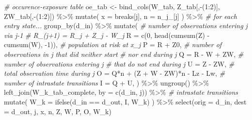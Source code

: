 \documentclass[10pt, twoside]{article}
\newenvironment{Shaded}{}{}
\newcommand{\AttributeTok}[1]{#1}
\newcommand{\CommentTok}[1]{\textit{#1}}
\newcommand{\DecValTok}[1]{#1}
\newcommand{\FunctionTok}[1]{#1}
\newcommand{\NormalTok}[1]{#1}
\newcommand{\OtherTok}[1]{#1}
\newcommand{\SpecialCharTok}[1]{#1}
\newcommand{\StringTok}[1]{#1}
\begin{document}
\begin{Shaded}
\begin{Highlighting}[]
  \CommentTok{\# occurence{-}exposure table}
\NormalTok{  oe\_tab }\OtherTok{\textless{}{-}}
    \FunctionTok{bind\_cols}\NormalTok{(W\_tab, Z\_tab[,}\SpecialCharTok{{-}}\NormalTok{(}\DecValTok{1}\SpecialCharTok{:}\DecValTok{2}\NormalTok{)], ZW\_tab[,}\SpecialCharTok{{-}}\NormalTok{(}\DecValTok{1}\SpecialCharTok{:}\DecValTok{2}\NormalTok{)]) }\SpecialCharTok{\%\textgreater{}\%}
    \FunctionTok{mutate}\NormalTok{(}
      \AttributeTok{x =}\NormalTok{ breaks[j],}
      \AttributeTok{n =}\NormalTok{ n\_j\_[j]}
\NormalTok{    ) }\SpecialCharTok{\%\textgreater{}\%}
    \CommentTok{\# for each entry state...}
    \FunctionTok{group\_by}\NormalTok{(d\_in) }\SpecialCharTok{\%\textgreater{}\%}
    \FunctionTok{mutate}\NormalTok{(}
      \CommentTok{\# number of observations entering j via j{-}1}
      \CommentTok{\# R\_(j+1) = R\_j + Z\_j {-} W\_j}
      \AttributeTok{R =} \FunctionTok{c}\NormalTok{(}\DecValTok{0}\NormalTok{, }\FunctionTok{head}\NormalTok{(}\FunctionTok{cumsum}\NormalTok{(Z) }\SpecialCharTok{{-}} \FunctionTok{cumsum}\NormalTok{(W), }\SpecialCharTok{{-}}\DecValTok{1}\NormalTok{)),}
      \CommentTok{\# population at risk at x\_j}
      \AttributeTok{P =}\NormalTok{ R }\SpecialCharTok{+}\NormalTok{ Z0,}
      \CommentTok{\# number of observations in j that did neither start}
      \CommentTok{\# nor end during j}
      \AttributeTok{Q =}\NormalTok{ R }\SpecialCharTok{{-}}\NormalTok{ W }\SpecialCharTok{+}\NormalTok{ ZW,}
      \CommentTok{\# number of observations entering j}
      \CommentTok{\# that do not end during j}
      \AttributeTok{U =}\NormalTok{ Z }\SpecialCharTok{{-}}\NormalTok{ ZW,}
      \CommentTok{\# total observation time during j}
      \AttributeTok{O =}\NormalTok{ Q}\SpecialCharTok{*}\NormalTok{n }\SpecialCharTok{+}\NormalTok{ (Z }\SpecialCharTok{+}\NormalTok{ W }\SpecialCharTok{{-}}\NormalTok{ ZW)}\SpecialCharTok{*}\NormalTok{n }\SpecialCharTok{{-}}\NormalTok{ Lz }\SpecialCharTok{{-}}\NormalTok{ Lw,}
      \CommentTok{\# number of intrastate transitions}
      \AttributeTok{I =}\NormalTok{ Q }\SpecialCharTok{+}\NormalTok{ U,}
\NormalTok{    ) }\SpecialCharTok{\%\textgreater{}\%}
    \FunctionTok{ungroup}\NormalTok{() }\SpecialCharTok{\%\textgreater{}\%}
    \FunctionTok{left\_join}\NormalTok{(W\_k\_tab\_complete, }\AttributeTok{by =} \FunctionTok{c}\NormalTok{(}\StringTok{\textquotesingle{}d\_in\textquotesingle{}}\NormalTok{, }\StringTok{\textquotesingle{}j\textquotesingle{}}\NormalTok{)) }\SpecialCharTok{\%\textgreater{}\%}
    \CommentTok{\# intrastate transitions}
    \FunctionTok{mutate}\NormalTok{(}
      \AttributeTok{W\_k =} \FunctionTok{ifelse}\NormalTok{(d\_in }\SpecialCharTok{==}\NormalTok{ d\_out, I, W\_k)}
\NormalTok{    ) }\SpecialCharTok{\%\textgreater{}\%}
    \FunctionTok{select}\NormalTok{(}\AttributeTok{orig =}\NormalTok{ d\_in, }\AttributeTok{dest =}\NormalTok{ d\_out, j, x, n, Z, W, P, O, W\_k)}


\end{Highlighting}
\end{Shaded}
\end{document}
